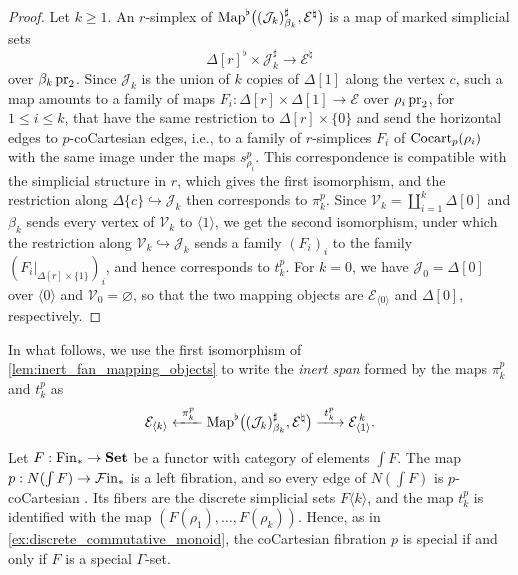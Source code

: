 \documentclass[10pt,reqno]{amsart}
\begin{document}
\begin{proof}
Let $k\geq1$. An $r$-simplex of
$\operatorname{Map}^\flat\bigl((\mathcal J_k)^\sharp_{\beta_k},
\mathcal E^\natural\bigr)$ is a map of marked simplicial sets
\[
\Delta[r]^\flat\times\mathcal J_k^\sharp
\longrightarrow\mathcal E^\natural
\]
over $\beta_k\operatorname{pr}_2$. Since $\mathcal J_k$ is the union of $k$
copies of $\Delta[1]$ along the vertex $c$, such a map amounts to
a family of maps $F_i:\Delta[r]\times\Delta[1]\to\mathcal E$ over
$\rho_i\operatorname{pr}_2$, for $1\leq i\leq k$, that have the same restriction
to $\Delta[r]\times\{0\}$ and send the horizontal edges to
$p$-coCartesian edges, i.e., to a family of $r$-simplices $F_i$
of $\operatorname{Cocart}_p(\rho_i)$ with the same image under the maps
$s_{\rho_i}^p$. This correspondence is compatible with the
simplicial structure in $r$, which gives the first isomorphism, and
the restriction along $\Delta\{c\}\hookrightarrow\mathcal J_k$ then
corresponds to $\pi_k^p$. Since
$\mathcal V_k=\coprod_{i=1}^k\Delta[0]$ and $\beta_k$ sends every
vertex of $\mathcal V_k$ to $\langle1\rangle$, we get the second
isomorphism, under which the restriction along
$\mathcal V_k\hookrightarrow\mathcal J_k$ sends a family
$(F_i)_i$ to the family $(F_i|_{\Delta[r]\times\{1\}})_i$, and
hence corresponds to $t_k^p$. For $k=0$, we have
$\mathcal J_0=\Delta[0]$ over $\langle0\rangle$ and
$\mathcal V_0=\varnothing$, so that the two mapping objects are
$\mathcal E_{\langle0\rangle}$ and $\Delta[0]$, respectively.
\end{proof}

In what follows, we use the first isomorphism of
\cref{lem:inert_fan_mapping_objects} to write the \emph{inert span}
formed by the maps $\pi_k^p$ and $t_k^p$ as
\begin{equation}
\label{eq:marked_inert_span}
\mathcal E_{\langle k\rangle}
\xleftarrow{\ \pi_k^p\ }
\operatorname{Map}^\flat\bigl((\mathcal J_k)^\sharp_{\beta_k},
                 \mathcal E^\natural\bigr)
\xrightarrow{\ t_k^p\ }\mathcal E_{\langle1\rangle}^{\,k}.
\end{equation}

\begin{ex}%
\label{ex:enriched_discrete_functor}
Let $F:\mathrm{Fin}_*\to\mathbf{Set}$ be a functor with category of elements
$\int F$. The map $p:N(\int F)\to\mathcal{F}\mathrm{in}_*$ is a left fibration, and
so every edge of $N(\int F)$ is $p$-coCartesian
\cite[\S2.1.1]{lurie2009higher}. Its fibers are the discrete simplicial
sets $F\langle k\rangle$, and the map $t_k^p$ is identified with
the map $(F(\rho_1),\ldots,F(\rho_k))$. Hence, as in
\cref{ex:discrete_commutative_monoid}, the coCartesian fibration $p$
is special if and only if $F$ is a special $\Gamma$-set.
\end{ex}
\end{document}
